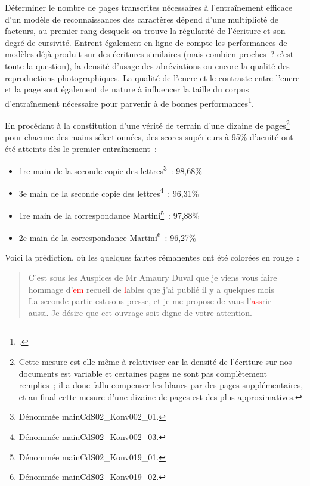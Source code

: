 \documentclass[a4paper,12pt,twoside]{book}
\begin{document}
				Déterminer le nombre de pages transcrites nécessaires à l'entraînement efficace d'un modèle de reconnaissances des caractères dépend d'une multiplicté de facteurs, au premier rang desquels on trouve la régularité de l'écriture et son degré de cursivité. Entrent également en ligne de compte les performances de modèles déjà produit sur des écritures similaires (mais combien proches~? c'est toute la question), la densité d'usage des abréviations ou encore la qualité des reproductions photographiques. La qualité de l'encre et le contraste entre l'encre et la page sont également de nature à influencer la taille du corpus d'entraînement nécessaire pour parvenir à de bonnes performances\footcite{stokesEScriptoriumVREManuscript2021}.
				
				En procédant à la constitution d'une vérité de terrain d'une dizaine de pages\footnote{Cette mesure est elle-même à relativiser car la densité de l'écriture sur nos documents est variable et certaines pages ne sont pas complètement remplies~; il a donc fallu compenser les blancs par des pages supplémentaires, et au final cette mesure d'une dizaine de pages est des plus approximatives.} pour chacune des mains sélectionnées, des scores supérieurs à 95\% d'acuité ont été atteints dès le premier entraînement~:
				
				\begin{itemize}
					\item 1re main de la seconde copie des lettres\footnote{Dénommée \textsf{mainCdS02\_Konv002\_01}.}~: 98,68\%
					\item 3e main de la seconde copie des lettres\footnote{Dénommée \textsf{mainCdS02\_Konv002\_03}.}~: 96,31\%
					\item 1re main de la correspondance Martini\footnote{Dénommée \textsf{mainCdS02\_Konv019\_01}.}~: 97,88\%
					\item 2e main de la correspondance Martini\footnote{Dénommée \textsf{mainCdS02\_Konv019\_02}.}~: 96,27\%
				\end{itemize}
			
				Voici la \gls{prédiction}, où les quelques fautes rémanentes ont été colorées en rouge~:
				
				\begin{quote}
					\textsf{C'est sous les Auspices de Mr Amaury Duval que je viens vous faire\\
					hommage d'\textcolor{red}{em} recueil de \textcolor{red}{l}ables que j'ai publié il y a quelques mois\\
					La seconde partie est sous presse, et je me propose de vaus l'\textcolor{red}{ass}rir\\
					aussi. Je désire que cet ouvrage soit digne de votre attention.}
				\end{quote}
							
\end{document}
